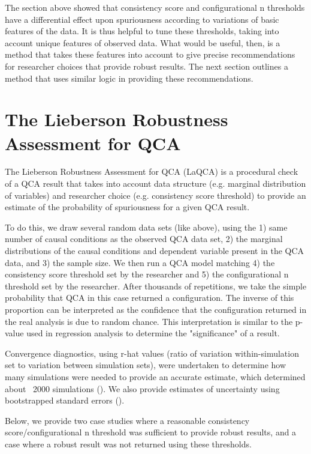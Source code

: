 \documentclass[]{article}
\begin{document}
The section above showed that consistency score and configurational n thresholds have a differential effect upon spuriousness according to variations of basic features of the data. It is thus helpful to tune these thresholds, taking into account unique features of observed data. What would be useful, then, is a method that takes these features into account to give precise recommendations for researcher choices that provide robust results. The next section outlines a method that uses similar logic in providing these recommendations. 

\section{The Lieberson Robustness Assessment for QCA}

The Lieberson Robustness Assessment for QCA (LaQCA) is a procedural check of a QCA result that takes into account data structure (e.g. marginal distribution of variables) and researcher choice (e.g. consistency score threshold) to provide an estimate of the probability of spuriousness for a given QCA result. 

To do this, we draw several random data sets (like above), using the 1) same number of causal conditions as the observed QCA data set, 2) the marginal distributions of the causal conditions and dependent variable present in the QCA data, and 3) the sample size. We then run a QCA model matching 4) the consistency score threshold set by the researcher and 5) the configurational n threshold set by the researcher. After thousands of repetitions, we take the simple probability that QCA in this case returned a configuration. The inverse of this proportion can be interpreted as the confidence that the configuration returned in the real analysis is due to random chance. This interpretation is similar to the p-value used in regression analysis to determine the "significance" of a result. 

Convergence diagnostics, using r-hat values (ratio of variation within-simulation set to variation between simulation sets), were undertaken to determine how many simulations were needed to provide an accurate estimate, which determined about ~2000 simulations (). We also provide estimates of uncertainty using bootstrapped standard errors (). 

Below, we provide two case studies where a reasonable consistency score/configurational n threshold was sufficient to provide robust results, and a case where a robust result was not returned using these thresholds. 
\end{document}
